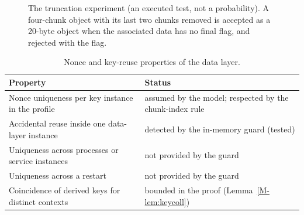 \documentclass[pdflatex,sn-mathphys-num]{sn-jnl}
\theoremstyle{plain}
\begin{document}
\begin{figure}[htbp]
\centering
\figbox{}
\caption{The truncation experiment (an executed test, not a probability). A four-chunk object with its last two chunks removed is accepted as a 20-byte object when the associated data has no final flag, and rejected with the flag.}\label{fig:truncation}
\end{figure}

\begin{table}[htbp]
\caption{Nonce and key-reuse properties of the data layer.}\label{tab:nonce}
\centering\footnotesize
\begin{tabularx}{\linewidth}{@{}>{\raggedright\arraybackslash}p{.46\linewidth}Y@{}}\toprule
Property & Status\\\midrule
Nonce uniqueness per key instance in the profile & assumed by the model; respected by the chunk-index rule\\
Accidental reuse inside one data-layer instance & detected by the in-memory guard (tested)\\
Uniqueness across processes or service instances & not provided by the guard\\
Uniqueness across a restart & not provided by the guard\\
Coincidence of derived keys for distinct contexts & bounded in the proof (Lemma~\ref{M-lem:keycoll})\\\bottomrule
\end{tabularx}
\end{table}
\end{document}
